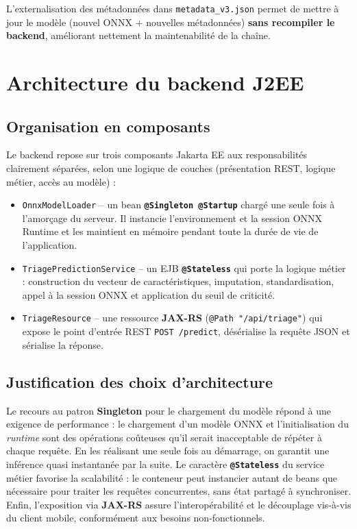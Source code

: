 \begin{successbox}
L'externalisation des métadonnées dans \texttt{metadata\_v3.json} permet de mettre à jour le
modèle (nouvel ONNX + nouvelles métadonnées) \textbf{sans recompiler le backend}, améliorant
nettement la maintenabilité de la chaîne.
\end{successbox}

\section{Architecture du backend J2EE}

\subsection{Organisation en composants}
Le backend repose sur trois composants Jakarta EE aux responsabilités clairement séparées,
selon une logique de couches (présentation REST, logique métier, accès au modèle) :

\begin{itemize}
  \item \texttt{OnnxModelLoader} -- un bean \textbf{\texttt{@Singleton @Startup}} chargé une
  seule fois à l'amorçage du serveur. Il instancie l'environnement et la session ONNX Runtime
  et les maintient en mémoire pendant toute la durée de vie de l'application.
  \item \texttt{TriagePredictionService} -- un EJB \textbf{\texttt{@Stateless}} qui porte la
  logique métier : construction du vecteur de caractéristiques, imputation, standardisation,
  appel à la session ONNX et application du seuil de criticité.
  \item \texttt{TriageResource} -- une ressource \textbf{JAX-RS} (\texttt{@Path
  "/api/triage"}) qui expose le point d'entrée REST \texttt{POST /predict}, désérialise la
  requête JSON et sérialise la réponse.
\end{itemize}

\subsection{Justification des choix d'architecture}
Le recours au patron \textbf{Singleton} pour le chargement du modèle répond à une exigence de
performance : le chargement d'un modèle ONNX et l'initialisation du \textit{runtime} sont des
opérations coûteuses qu'il serait inacceptable de répéter à chaque requête. En les réalisant
une seule fois au démarrage, on garantit une inférence quasi instantanée par la suite. Le
caractère \textbf{\texttt{@Stateless}} du service métier favorise la scalabilité : le conteneur
peut instancier autant de beans que nécessaire pour traiter les requêtes concurrentes, sans
état partagé à synchroniser. Enfin, l'exposition via \textbf{JAX-RS} assure l'interopérabilité
et le découplage vis-à-vis du client mobile, conformément aux besoins non-fonctionnels.

